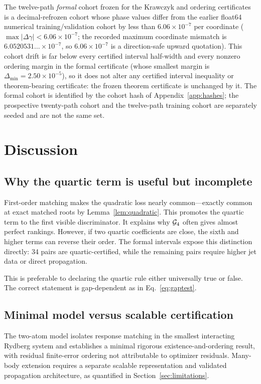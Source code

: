 The twelve-path \emph{formal} cohort frozen for the Krawczyk and ordering certificates is a
decimal-refrozen cohort whose phase values differ from the earlier float64 numerical
training/validation cohort by less than $6.06\times10^{-7}$ per coordinate
($\max\lvert\Delta\gamma\rvert<6.06\times10^{-7}$; the recorded maximum coordinate
mismatch is $6.0520531\ldots\times10^{-7}$, so $6.06\times10^{-7}$ is a direction-safe
upward quotation). This cohort drift
is far below every certified interval half-width and every nonzero ordering margin in the
formal certificate (whose smallest margin is $\Delta_{\min}=2.50\times10^{-5}$), so it does
not alter any certified interval inequality or theorem-bearing certificate: the frozen
theorem certificate is unchanged by it. The
formal cohort is identified by the cohort hash of Appendix~\ref{app:hashes}; the
prospective twenty-path cohort and the twelve-path training cohort are separately seeded
and are not the same set.

\section{Discussion}\label{sec:discussion}

\subsection{Why the quartic term is useful but incomplete}

First-order matching makes the quadratic loss nearly common---exactly common at exact
matched roots by Lemma~\ref{lem:quadratic}. This promotes the quartic term to the first
visible discriminator. It explains why $\mathcal{G}_{4}$ often gives almost perfect rankings.
However, if two quartic coefficients are close, the sixth and higher terms can reverse
their order. The formal intervals expose this distinction directly: 34 pairs are
quartic-certified, while the remaining pairs require higher jet data or direct propagation.

This is preferable to declaring the quartic rule either universally true or false. The
correct statement is gap-dependent as in Eq.~\eqref{eq:gaptest}.

\subsection{Minimal model versus scalable certification}

The two-atom model isolates response matching in the smallest interacting Rydberg system
and establishes a minimal rigorous existence-and-ordering result, with residual
finite-error ordering not attributable to optimizer residuals. Many-body extension
requires a separate scalable representation and validated propagation architecture, as
quantified in Section~\ref{sec:limitations}.

